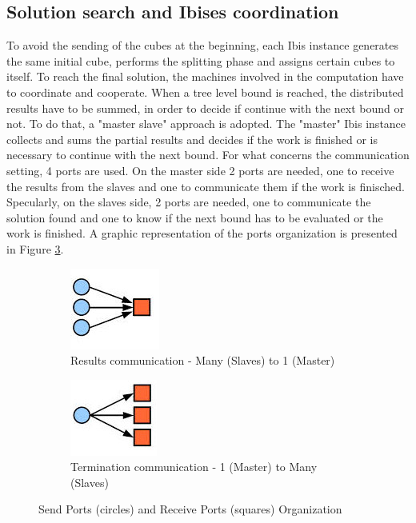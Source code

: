 \documentclass[a4paper]{article}
\begin{document}
\subsection{Solution search and Ibises coordination}
\label{sec:ibis_setting}
To avoid the sending of the cubes at the beginning, each Ibis instance generates the same initial cube, performs the splitting phase and assigns certain cubes to itself. To reach the final solution, the machines involved in the computation have to coordinate and cooperate. When a tree level bound is reached, the distributed results have to be summed, in order to decide if continue with the next bound or not. To do that, a "master slave" approach is adopted. The "master" Ibis instance collects and sums the partial results and decides if the work is finished or is necessary to continue with the next bound. For what concerns the communication setting, 4 ports are used. On the master side 2 ports are needed, one to receive the results from the slaves and one to communicate them if the work is finisched. Specularly, on the slaves side, 2 ports are needed, one to communicate the solution found and one to know if the next bound has to be evaluated or the work is finished. A graphic representation of the ports organization is presented in Figure \ref{fig:ports}.

\begin{figure}[!ht]
\begin{subfigure}{0.5\textwidth}
\centering
\includegraphics[width=0.35\linewidth]{results}
\caption{Results communication - Many (Slaves) to 1 (Master)} \label{fig:ca}
\end{subfigure}
\hspace*{\fill} %
\begin{subfigure}{0.5\textwidth}
\centering
\includegraphics[width=0.35\linewidth]{continue}
\caption{Termination communication - 1 (Master) to Many (Slaves)} \label{fig:cb}
\end{subfigure}
\caption{Send Ports (circles) and Receive Ports (squares) Organization} \label{fig:ports}
\end{figure}
\FloatBarrier
\end{document}
